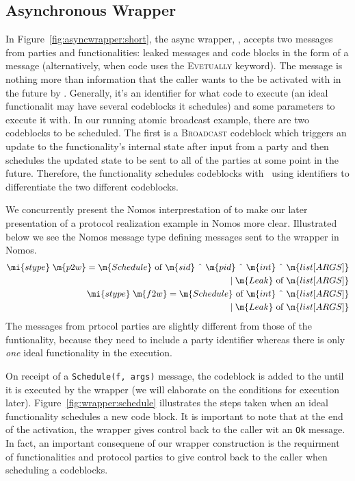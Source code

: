 \subsection{Asynchronous Wrapper}
In Figure~\ref{fig:asyncwrapper:short}, the async wrapper, \Wasync, accepts two messages from parties and functionalities: leaked messages and code blocks in the form of a  message (alternatively, when code uses the \textsc{Evetually} keyword).
The  message is nothing more than information that the caller wants to the be activated with in the future by \Wasync.
Generally, it's an identifier for what code to execute (an ideal functionalit may have several codeblocks it schedules) and some parameters to execute it with.
In our running atomic broadcast example, there are two codeblocks to be scheduled.
The first is a \textsc{Broadcast} codeblock which triggers an update to the functionality's internal state after input from a party and then schedules the updated state to be sent to all of the parties at some point in the future.
Therefore, the functionality schedules codeblocks with \Wasync~using identifiers to differentiate the two different codeblocks.

We concurrently present the Nomos interprestation of \Wasync to make our later presentation of a protocol realization example in Nomos more clear.
Illustrated below we see the Nomos message type defining  messages sent to the wrapper in Nomos.
\begin{align*}
\mi{stype} \; \m{p2w} = \m{Schedule} \text{ of } \m{sid} \text{ \^{} } \m{pid} \text{ \^{} } \m{int} \text{ \^{} } \m{list[ARGS]} \\
| \; \m{Leak} \text{ of } \m{list[ARGS]}  \\
\mi{stype} \; \m{f2w} = \m{Schedule} \text{ of } \m{int} \text{ \^{} } \m{list[ARGS]} \\ 
| \; \m{Leak} \text{ of } \m{list[ARGS]}
\end{align*}
The  messages from prtocol parties are slightly different from those of the funtionality, because they need to include a party identifier whereas there is only \textit{one} ideal functionality in the execution.

On receipt of a \texttt{Schedule(f, args)} message, the codeblock is added to the  until it is executed by the wrapper (we will elaborate on the conditions for execution later). 
Figure~\ref{fig:wrapper:schedule} illustrates the steps taken when an ideal functionality schedules a new code block.
It is important to note that at the end of the activation, the wrapper gives control back to the caller wit an \texttt{Ok} message.
In fact, an important consequene of our wrapper construction is the requirment of functionalities and protocol parties to give control back to the caller when scheduling a codeblocks.

